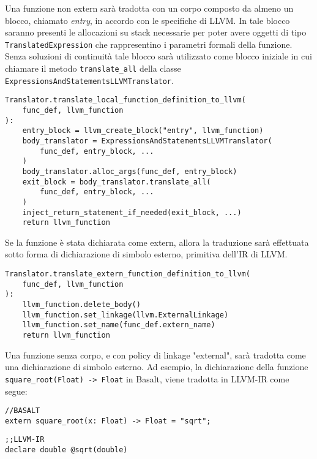 Una funzione non extern sarà tradotta con un corpo composto da almeno un blocco,
chiamato \textit{entry}, in accordo con le specifiche di LLVM. In tale blocco saranno 
presenti le allocazioni su stack necessarie per poter avere oggetti di tipo 
\texttt{TranslatedExpression} che rappresentino i parametri formali della funzione. Senza 
soluzioni di continuità tale blocco sarà utilizzato come blocco iniziale in cui 
chiamare il metodo \texttt{translate\_all} della classe 
\texttt{ExpressionsAndStatementsLLVMTranslator}. \\

\begin{lstlisting}[frame=single]
Translator.translate_local_function_definition_to_llvm(
    func_def, llvm_function
):
    entry_block = llvm_create_block("entry", llvm_function)
    body_translator = ExpressionsAndStatementsLLVMTranslator(
        func_def, entry_block, ...
    )
    body_translator.alloc_args(func_def, entry_block)
    exit_block = body_translator.translate_all(
        func_def, entry_block, ...
    )
    inject_return_statement_if_needed(exit_block, ...)
    return llvm_function
\end{lstlisting}
\vspace{0.5cm}

Se la funzione è stata dichiarata come extern, allora la traduzione 
sarà effettuata sotto forma di dichiarazione di simbolo esterno, primitiva 
dell'IR di LLVM. \\

\begin{lstlisting}[frame=single]
Translator.translate_extern_function_definition_to_llvm(
    func_def, llvm_function
):  
    llvm_function.delete_body()
    llvm_function.set_linkage(llvm.ExternalLinkage)
    llvm_function.set_name(func_def.extern_name)
    return llvm_function
\end{lstlisting}
\vspace{0.5cm}

Una funzione senza corpo, e con policy di linkage "external", sarà tradotta 
come una dichiarazione di simbolo esterno. Ad esempio, la dichiarazione della funzione 
\texttt{square\_root(Float) -> Float} in Basalt, viene tradotta in LLVM-IR come segue: \\

\begin{lstlisting}[frame=single]
//BASALT
extern square_root(x: Float) -> Float = "sqrt";
\end{lstlisting}
\begin{lstlisting}[frame=single]
;;LLVM-IR
declare double @sqrt(double)
\end{lstlisting}

\newpage